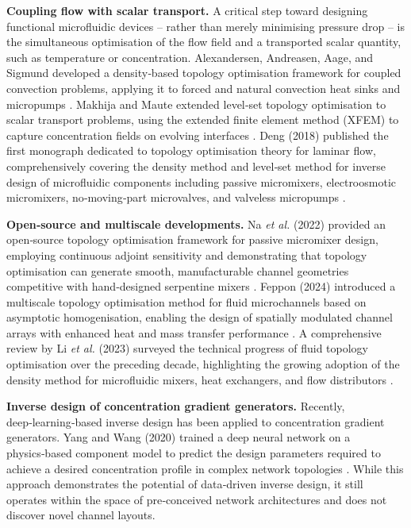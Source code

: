\documentclass[12pt]{article}
\begin{document}
\textbf{Coupling flow with scalar transport.} A critical step toward designing functional microfluidic devices – rather than merely minimising pressure drop – is the simultaneous optimisation of the flow field and a transported scalar quantity, such as temperature or concentration. Alexandersen, Andreasen, Aage, and Sigmund developed a density‑based topology optimisation framework for coupled convection problems, applying it to forced and natural convection heat sinks and micropumps \cite{alexandersen2014, alexandersen2020}. Makhija and Maute extended level‑set topology optimisation to scalar transport problems, using the extended finite element method (XFEM) to capture concentration fields on evolving interfaces \cite{makhija2015}. Deng (2018) published the first monograph dedicated to topology optimisation theory for laminar flow, comprehensively covering the density method and level‑set method for inverse design of microfluidic components including passive micromixers, electroosmotic micromixers, no‑moving‑part microvalves, and valveless micropumps \cite{deng2018}.

\textbf{Open‑source and multiscale developments.} Na \textit{et al.} (2022) provided an open‑source topology optimisation framework for passive micromixer design, employing continuous adjoint sensitivity and demonstrating that topology optimisation can generate smooth, manufacturable channel geometries competitive with hand‑designed serpentine mixers \cite{na2022}. Feppon (2024) introduced a multiscale topology optimisation method for fluid microchannels based on asymptotic homogenisation, enabling the design of spatially modulated channel arrays with enhanced heat and mass transfer performance \cite{feppon2024}. A comprehensive review by Li \textit{et al.} (2023) surveyed the technical progress of fluid topology optimisation over the preceding decade, highlighting the growing adoption of the density method for microfluidic mixers, heat exchangers, and flow distributors \cite{li2023}.

\textbf{Inverse design of concentration gradient generators.} Recently, deep‑learning‑based inverse design has been applied to concentration gradient generators. Yang and Wang (2020) trained a deep neural network on a physics‑based component model to predict the design parameters required to achieve a desired concentration profile in complex network topologies \cite{yang2020}. While this approach demonstrates the potential of data‑driven inverse design, it still operates within the space of pre‑conceived network architectures and does not discover novel channel layouts.
\end{document}
